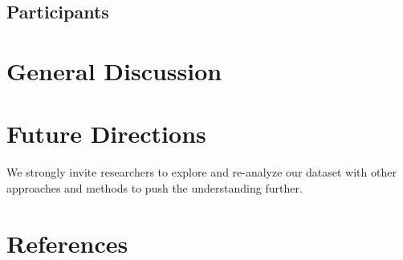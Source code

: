 \documentclass[
  man,floatsintext]{apa6}
\newlength{\cslhangindent}
\newlength{\cslentryspacingunit} %
\newenvironment{CSLReferences}[2] %
 {%
  \setlength{\parindent}{0pt}
  \ifodd #1
  \let\oldpar\par
  \def\par{\hangindent=\cslhangindent\oldpar}
  \fi
  \setlength{\parskip}{#2\cslentryspacingunit}
 }%
 {}
\begin{document}
\hypertarget{participants-1}{%
\subsection{Participants}\label{participants-1}}

\hypertarget{general-discussion}{%
\section{General Discussion}\label{general-discussion}}

\hypertarget{future-directions}{%
\section{Future Directions}\label{future-directions}}

We strongly invite researchers to explore and re-analyze our dataset with other approaches and methods to push the understanding further.

\newpage

\hypertarget{references}{%
\section{References}\label{references}}

\hypertarget{refs}{}
\begin{CSLReferences}{0}{0}
\end{CSLReferences}


\clearpage
\renewcommand{\listfigurename}{Figure captions}
\end{document}
